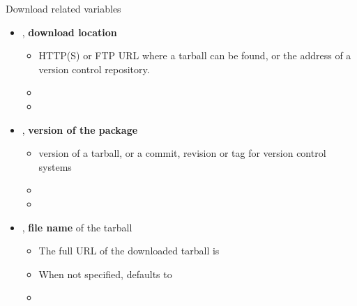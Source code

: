 \begin{frame}{Download related variables}
  \begin{itemize}
  \item {}, {\bf download location}
    \begin{itemize}
    \item HTTP(S) or FTP URL where a tarball can be found, or the address
      of a version control repository.
    \item {}
    \item {}
    \end{itemize}
  \item {}, {\bf version of the
    package}
  \begin{itemize}
    \item version of a tarball, or a commit, revision or tag for
      version control systems
    \item {}
    \item {}
    \end{itemize}
  \item {}, {\bf file name} of the tarball
    \begin{itemize}
    \item The full URL of the downloaded tarball is
    \item When not specified, defaults to
    \item {}
    \end{itemize}
  \end{itemize}
\end{frame}

